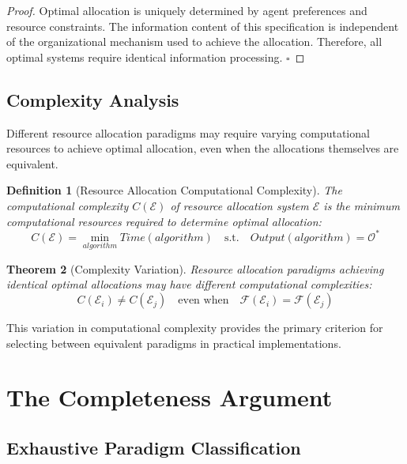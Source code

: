 \documentclass[12pt,a4paper]{article}
\newtheorem{theorem}{Theorem}
\newtheorem{definition}[theorem]{Definition}
\begin{document}
\begin{proof}
Optimal allocation is uniquely determined by agent preferences and resource constraints. The information content of this specification is independent of the organizational mechanism used to achieve the allocation. Therefore, all optimal systems require identical information processing. $\square$
\end{proof}

\subsection{Complexity Analysis}

Different resource allocation paradigms may require varying computational resources to achieve optimal allocation, even when the allocations themselves are equivalent.

\begin{definition}[Resource Allocation Computational Complexity]
The computational complexity $C(\mathcal{E})$ of resource allocation system $\mathcal{E}$ is the minimum computational resources required to determine optimal allocation:
\begin{equation}
C(\mathcal{E}) = \min_{algorithm} Time(algorithm) \quad \text{s.t.} \quad Output(algorithm) = \mathcal{O}^*
\end{equation}
\end{definition}

\begin{theorem}[Complexity Variation]
Resource allocation paradigms achieving identical optimal allocations may have different computational complexities:
\begin{equation}
C(\mathcal{E}_i) \neq C(\mathcal{E}_j) \quad \text{even when} \quad \mathcal{F}(\mathcal{E}_i) = \mathcal{F}(\mathcal{E}_j)
\end{equation}
\end{theorem}

This variation in computational complexity provides the primary criterion for selecting between equivalent paradigms in practical implementations.

\section{The Completeness Argument}

\subsection{Exhaustive Paradigm Classification}
\end{document}
